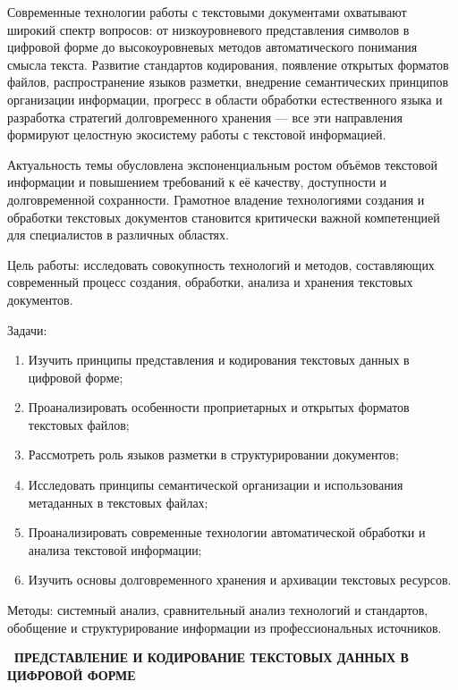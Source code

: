 \documentclass{SibFU-docs}
\begin{document}
Современные технологии работы с текстовыми документами охватывают широкий спектр вопросов: от низкоуровневого представления символов в цифровой форме до высокоуровневых методов автоматического понимания смысла текста. Развитие стандартов кодирования, появление открытых форматов файлов, распространение языков разметки, внедрение семантических принципов организации информации, прогресс в области обработки естественного языка и разработка стратегий долговременного хранения — все эти направления формируют целостную экосистему работы с текстовой информацией.

Актуальность темы обусловлена экспоненциальным ростом объёмов текстовой информации и повышением требований к её качеству, доступности и долговременной сохранности. Грамотное владение технологиями создания и обработки текстовых документов становится критически важной компетенцией для специалистов в различных областях.

Цель работы: исследовать совокупность технологий и методов, составляющих современный процесс создания, обработки, анализа и хранения текстовых документов.

Задачи:
\begin{enumerate}
\item Изучить принципы представления и кодирования текстовых данных в цифровой форме;
\item Проанализировать особенности проприетарных и открытых форматов текстовых файлов;
\item Рассмотреть роль языков разметки в структурировании документов;
\item Исследовать принципы семантической организации и использования метаданных в текстовых файлах;
\item Проанализировать современные технологии автоматической обработки и анализа текстовой информации;
\item Изучить основы долговременного хранения и архивации текстовых ресурсов.
\end{enumerate}

Методы: системный анализ, сравнительный анализ технологий и стандартов, обобщение и структурирование информации из профессиональных источников.

\newpage
\vspace*{-2.5em}
\begin{center}\textbf{\thesection\ ПРЕДСТАВЛЕНИЕ И КОДИРОВАНИЕ ТЕКСТОВЫХ ДАННЫХ В ЦИФРОВОЙ ФОРМЕ}\end{center}
\vspace*{-1.5em}
\end{document}
